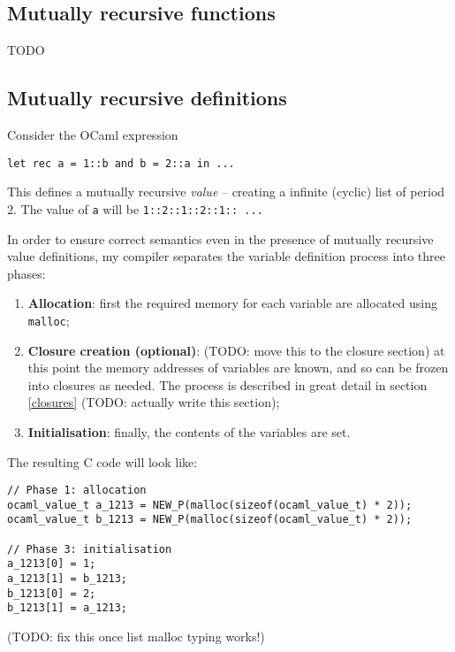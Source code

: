 \documentclass[12pt,a4paper,twoside,openright]{report}
\begin{document}
\subsection{Mutually recursive functions}\label{mutually-recursive-functions}

TODO

\subsection{Mutually recursive definitions}\label{mutually-recursive-values}

Consider the OCaml expression

\begin{lstlisting}
let rec a = 1::b and b = 2::a in ...
\end{lstlisting}

This defines a mutually recursive \textit{value} -- creating a infinite
(cyclic) list of period 2. The value of \lstinline!a! will be
\lstinline!1::2::1::2::1:: ...!

In order to ensure correct semantics even in the presence of mutually recursive
value definitions, my compiler separates the variable definition process into
three phases:

\begin{enumerate}
  \item \textbf{Allocation}: first the required memory for each variable are
    allocated using \lstinline!malloc!;
  \item \textbf{Closure creation (optional)}: (TODO: move this to the closure section)  at this point the memory
    addresses of variables are known, and so can be frozen into closures as
    needed. The process is described in great detail in section \ref{closures}
    (TODO: actually write this section);
  \item \textbf{Initialisation}: finally, the contents of the variables are
    set.
\end{enumerate}

The resulting C code will look like:

\begin{lstlisting}
// Phase 1: allocation
ocaml_value_t a_1213 = NEW_P(malloc(sizeof(ocaml_value_t) * 2));
ocaml_value_t b_1213 = NEW_P(malloc(sizeof(ocaml_value_t) * 2));

// Phase 3: initialisation
a_1213[0] = 1;
a_1213[1] = b_1213;
b_1213[0] = 2;
b_1213[1] = a_1213;
\end{lstlisting}
(TODO: fix this once list malloc typing works!)
\end{document}
